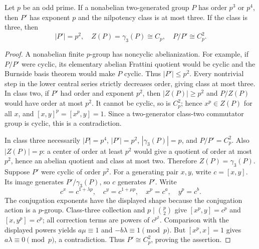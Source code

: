 \begin{lemma}\label{lem:derived}
Let $p$ be an odd prime. If a nonabelian two-generated group $P$ has order $p^3$ or $p^4$,
then $P'$ has exponent $p$ and the nilpotency class is at most three.
If the class is three, then
\[
|P'|=p^2,\quad Z(P)=\gamma_3(P)\cong C_p,\quad P/P'\cong C_p^2.
\]
\end{lemma}
\begin{proof}
A nonabelian finite $p$-group has noncyclic abelianization. For example,
if $P/P'$ were cyclic, its elementary abelian Frattini quotient would
be cyclic and the Burnside basis theorem would make $P$ cyclic.
Thus $|P'|\leq p^2$. Every nontrivial step in the lower central
series strictly decreases order, giving class at most three.
In class two, if $P'$ had order and exponent $p^2$, then
$|Z(P)|\geq p^2$ and $P/Z(P)$ would have order at most $p^2$.
It cannot be cyclic, so is $C_p^2$; hence $x^p\in Z(P)$ for all
$x$, and $[x,y]^p=[x^p,y]=1$. Since a two-generator class-two
commutator group is cyclic, this is a contradiction.

In class three necessarily $|P|=p^4$, $|P'|=p^2$,
$|\gamma_3(P)|=p$, and $P/P'=C_p^2$.
Also $|Z(P)|=p$: a center of order at least $p^2$ would give a
quotient of order at most $p^2$, hence an abelian quotient and class
at most two. Therefore $Z(P)=\gamma_3(P)$.
Suppose $P'$ were cyclic of order $p^2$. For a generating pair $x,y$,
write $c=[x,y]$. Its image generates $P'/\gamma_3(P)$,
so $c$ generates $P'$. Write
\[
c^x=c^{1+\lambda p},\quad c^y=c^{1+\mu p},\quad
x^p=c^a,\quad y^p=c^b.
\]
The conjugation exponents have the displayed shape because the
conjugation action is a $p$-group. Class-three collection and
$p\mid\binom p2$ give $[x^p,y]=c^p$ and $[x,y^p]=c^p$;
all correction terms are powers of $c^{p^2}$.
Comparison with the displayed powers yields
$a\mu\equiv1$ and $-b\lambda\equiv1\pmod p$.
But $[x^p,x]=1$ gives $a\lambda\equiv0\pmod p$, a contradiction.
Thus $P'\cong C_p^2$, proving the assertion.
\end{proof}

